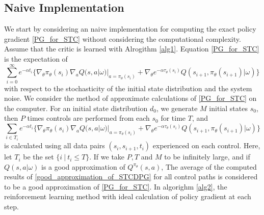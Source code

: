 \documentclass[english, dvipdfmx]{ampmt}             %
\begin{document}
\subsection{Naive Implementation}
We start by considering an naive implementation for computing the exact policy gradient \eqref{PG_for_STC} without considering the computational complexity. Assume that the critic is learned with Alrogithm \ref{alg1}. Equation \eqref{PG_for_STC} is the expectation of
\begin{equation}
	\sum_{i=0}^{\infty} e^{-\alpha t_i}\{\nabla_{\theta}\pi_{\theta}(s_i)\nabla_{a}Q(s,a|\omega)|_{a=\pi_{\theta}(s_i)} + \nabla_{\theta}e^{-\alpha\tau_{\theta}(s_{i})}Q(s_{i+1},\pi_{\theta}(s_{i+1})|\omega)\} \label{path_gradient}
\end{equation}
with respect to the stochasticity of the initial state distribution and the system noise. We consider the method of approximate calculations of \eqref{PG_for_STC} on the computer. For an initial state distribution $d_0$, we generate $M$ initial states $s_0$, then $P$ times controls are performed from each $s_0$ for time $T$, and
\begin{equation}
	\sum_{i\in T_i} e^{-\alpha t_i}\{\nabla_{\theta}\pi_{\theta}(s_i)\nabla_{a}Q(s,a|\omega)|_{a=\pi_{\theta}(s_i)} + \nabla_{\theta}e^{-\alpha\tau_{\theta}(s_{i})}Q(s_{i+1},\pi_{\theta}(s_{i+1})|\omega)\} \label{good_approximation_of_STCDPG}
\end{equation}
is calculated using all data pairs $(s_i,s_{i+1}, t_i)$ experienced on each control. Here, let $T_i$ be the set $\{i~|~t_i \leq T\}$. If we take $P, T$ and $M$ to be infinitely large, and if $Q(s,a|\omega)$ is a good approximation of $Q^{\pi_{\theta}}(s,a)$, The average of the computed results of \eqref{good_approximation_of_STCDPG} for all control paths is considered to be a good approximation of \eqref{PG_for_STC}. In algorighm \ref{alg2}, the reinforcement learning method with ideal calculation of policy gradient at each step. 
\end{document}
